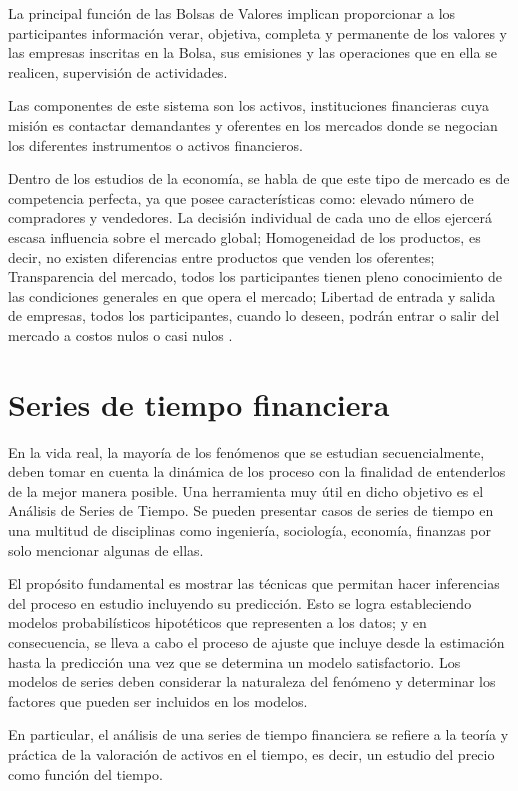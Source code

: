 La principal función de las Bolsas de Valores implican proporcionar a los participantes información verar, objetiva, completa y permanente de los valores
y las empresas inscritas en la Bolsa, sus emisiones y las operaciones que en ella se realicen, supervisión de actividades.

Las componentes de este sistema son los activos, instituciones financieras cuya misión es contactar demandantes y oferentes en los mercados donde se negocian
los diferentes instrumentos o activos financieros.

Dentro de los estudios de la economía, se habla de que este tipo de mercado es de competencia perfecta, ya que posee características
como: elevado número de compradores y vendedores. La decisión individual de cada uno de ellos ejercerá escasa influencia sobre el mercado global; 
Homogeneidad de los productos, es decir, no existen diferencias entre productos que venden los oferentes; Transparencia del mercado, todos los 
participantes tienen pleno conocimiento de las condiciones generales en que opera el mercado; Libertad de entrada y salida de empresas, todos 
los participantes, cuando lo deseen, podrán entrar o salir del mercado a costos nulos o casi nulos \cite{mankiw2011principles}.

\section{Series de tiempo financiera}

En la vida real, la mayoría de los fenómenos que se estudian secuencialmente, deben
tomar en cuenta la dinámica de los proceso con la finalidad de entenderlos de la mejor manera
posible. Una herramienta muy útil en dicho objetivo es el Análisis de Series de Tiempo. Se
pueden presentar casos de series de tiempo en una multitud de disciplinas como ingeniería,
sociología, economía, finanzas por solo mencionar algunas de ellas.

El propósito fundamental es mostrar las técnicas que permitan hacer inferencias del
proceso en estudio incluyendo su predicción. Esto se logra estableciendo modelos
probabilísticos hipotéticos que representen a los datos; y en consecuencia, se lleva a cabo el
proceso de ajuste que incluye desde la estimación hasta la predicción una vez que se determina
un modelo satisfactorio. Los modelos de series deben considerar la naturaleza del fenómeno y determinar 
los factores que pueden ser incluidos en los modelos.

En particular, el análisis de una series de tiempo financiera se refiere a la teoría y práctica de la valoración 
de activos en el tiempo, es decir, un estudio del precio como función del tiempo.

